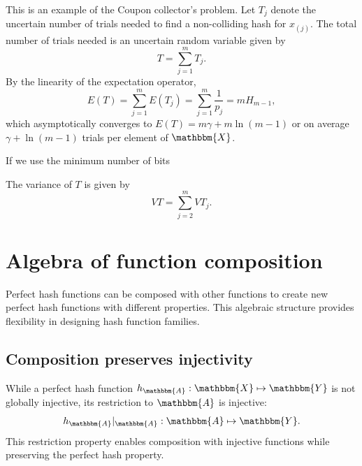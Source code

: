 \documentclass[hidelinks,11pt,final]{article}
\theoremstyle{plain}
\begin{document}
This is an example of the Coupon collector's problem.
Let $T_j$ denote the uncertain number of trials needed to find a non-colliding hash for $x_{(j)}$.
The total number of trials needed is an uncertain random variable given by
\begin{equation}
T = \sum_{j=1}^{m} T_j.
\end{equation}
By the linearity of the expectation operator,
\begin{equation}
E(T) = \sum_{j=1}^{m} E(T_j) = \sum_{j=1}^{m} \frac{1}{p_j} = m H_{m-1},
\end{equation}
which asymptotically converges to $E(T) = m \gamma + m \ln(m-1)$ or on average $\gamma + \ln (m-1)$ trials per element of $\mathbbm{X}$.

If we use the minimum number of bits

The variance of $T$ is given by
\begin{equation}
V{T} = \sum_{j=2}^{m }V{T_j}.
\end{equation}



\section{Algebra of function composition}

Perfect hash functions can be composed with other functions to create new perfect hash functions with different properties. This algebraic structure provides flexibility in designing hash function families.

\subsection{Composition preserves injectivity}

While a perfect hash function $h_\mathbbm{A} : \mathbbm{X} \mapsto \mathbbm{Y}$ is not globally injective, its restriction to $\mathbbm{A}$ is injective:
\begin{equation}
	h_\mathbbm{A}|_{\mathbbm{A}} : \mathbbm{A} \mapsto \mathbbm{Y}.
\end{equation}
This restriction property enables composition with injective functions while preserving the perfect hash property.
\end{document}
